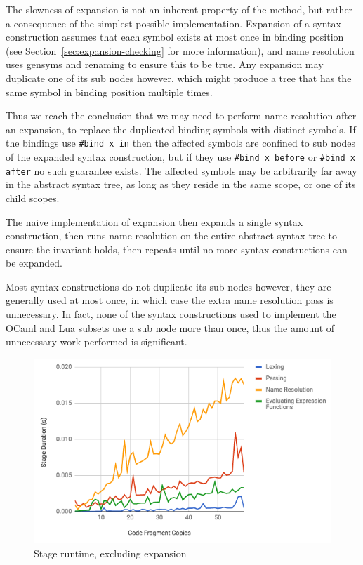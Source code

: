 \documentclass{kththesis}
\begin{document}
The slowness of expansion is not an inherent property of the method, but rather a consequence of the simplest possible implementation. Expansion of a syntax construction assumes that each symbol exists at most once in binding position (see Section~\ref{sec:expansion-checking} for more information), and name resolution uses gensyms and renaming to ensure this to be true. Any expansion may duplicate one of its sub nodes however, which might produce a tree that has the same symbol in binding position multiple times.

Thus we reach the conclusion that we may need to perform name resolution after an expansion, to replace the duplicated binding symbols with distinct symbols. If the bindings use \texttt{#bind x in} then the affected symbols are confined to sub nodes of the expanded syntax construction, but if they use \texttt{#bind x before} or \texttt{#bind x after} no such guarantee exists. The affected symbols may be arbitrarily far away in the abstract syntax tree, as long as they reside in the same scope, or one of its child scopes.

The naive implementation of expansion then expands a single syntax construction, then runs name resolution on the entire abstract syntax tree to ensure the invariant holds, then repeats until no more syntax constructions can be expanded.

Most syntax constructions do not duplicate its sub nodes however, they are generally used at most once, in which case the extra name resolution pass is unnecessary. In fact, none of the syntax constructions used to implement the OCaml and Lua subsets use a sub node more than once, thus the amount of unnecessary work performed is significant.

\begin{figure}[h]
\includegraphics[width=\textwidth]{resources/performance-graph-without-expansion}
\caption{Stage runtime, excluding expansion}
\label{fig:performance-graph-without-expansion}
\end{figure}
\end{document}
